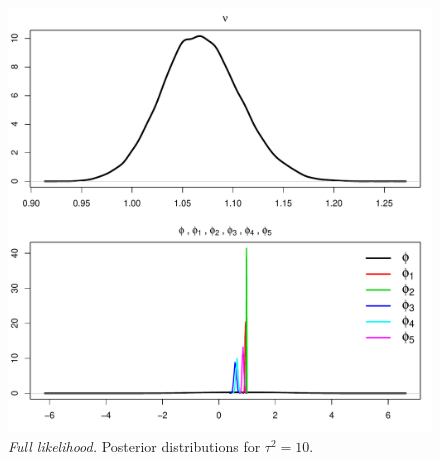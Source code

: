 \documentclass[12pt]{article}
\begin{document}
\begin{figure}[H]
\begin{center}
\includegraphics[scale=0.45]{figs/posts_2c.pdf}
\end{center}
\caption{\emph{Full likelihood.} Posterior distributions for $\tau^2=10$.}
\label{posts2c}
\end{figure}
\end{document}
